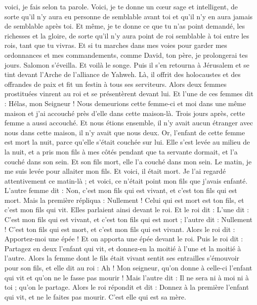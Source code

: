 \begin{multicols}{2}
voici, je fais selon ta parole. Voici, je te donne un cœur sage et intelligent, de sorte qu'il n'y aura eu personne de semblable avant toi et qu’il n'y en aura jamais de semblable après toi.
Et même, je te donne ce que tu n'as point demandé, les richesses et la gloire, de sorte qu'il n'y aura point de roi semblable à toi entre les rois, tant que tu vivras.
Et si tu marches dans mes voies pour garder mes ordonnances et mes commandements, comme David, ton père, je prolongerai tes jours.
Salomon s’éveilla. Et voilà le songe. Puis il s'en retourna à Jérusalem et se tint devant l'Arche de l'alliance de Yahweh. Là, il offrit des holocaustes et des offrandes de paix et fit un festin à tous ses serviteurs.
Alors deux femmes prostituées vinrent au roi et se présentèrent devant lui.
Et l'une de ces femmes dit : Hélas, mon Seigneur ! Nous demeurions cette femme-ci et moi dans une même maison et j'ai accouché près d’elle dans cette maison-là.
Trois jours après, cette femme a aussi accouché. Et nous étions ensemble, il n'y avait aucun étranger avec nous dans cette maison, il n’y avait que nous deux.
Or, l'enfant de cette femme est mort la nuit, parce qu'elle s'était couchée sur lui.
Elle s'est levée au milieu de la nuit, et a pris mon fils à mes côtés pendant que ta servante dormait, et l'a couché dans son sein. Et son fils mort, elle l’a couché dans mon sein.
Le matin, je me suis levée pour allaiter mon fils. Et voici, il était mort. Je l’ai regardé attentivement ce matin-là ; et voici, ce n'était point mon fils que j'avais enfanté.
L’autre femme dit : Non, c’est mon fils qui est vivant, et c’est ton fils qui est mort. Mais la première répliqua : Nullement ! Celui qui est mort est ton fils, et c’est mon fils qui vit. Elles parlaient ainsi devant le roi.
Et le roi dit : L’une dit : C’est mon fils qui est vivant, et c’est ton fils qui est mort ; l’autre dit : Nullement ! C’est ton fils qui est mort, et c’est mon fils qui est vivant.
Alors le roi dit : Apportez-moi une épée ! Et on apporta une épée devant le roi.
Puis le roi dit : Partagez en deux l'enfant qui vit, et donnez-en la moitié à l'une et la moitié à l'autre.
Alors la femme dont le fils était vivant sentit ses entrailles s’émouvoir pour son fils, et elle dit au roi : Ah ! Mon seigneur, qu'on donne à celle-ci l'enfant qui vit et qu'on ne le fasse pas mourir ! Mais l'autre dit : Il ne sera ni à moi ni à toi ; qu'on le partage.
Alors le roi répondit et dit : Donnez à la première l'enfant qui vit, et ne le faites pas mourir. C’est elle qui est sa mère.

\end{multicols}
